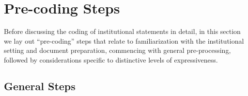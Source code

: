 \clearpairofpagestyles
\chead{\headmark}
\ifoot{\ifootertext}
\ofoot{\ofootertext}
\cfoot{\thepage}

\section{Pre-coding Steps}
\label{sec:PrecodingSteps}

Before discussing the coding of institutional statements in detail, in this section we lay out ``pre-coding'' steps that relate to familiarization with the institutional setting and document preparation, commencing with general pre-processing, followed by considerations specific to distinctive levels of expressiveness.

\subsection{General Steps}


